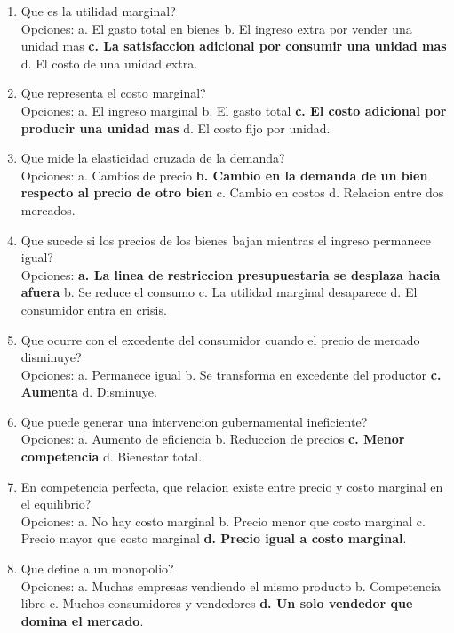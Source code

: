 \documentclass[
	spanish,
	letterpaper, oneside
]{article}
\begin{document}
\begin{enumerate}
	\item Que es la utilidad marginal?\\
	Opciones: a. El gasto total en bienes \quad b. El ingreso extra por vender una unidad mas \quad \textbf{c. La satisfaccion adicional por consumir una unidad mas} \quad d. El costo de una unidad extra.

	\item Que representa el costo marginal?\\
	Opciones: a. El ingreso marginal \quad b. El gasto total \quad \textbf{c. El costo adicional por producir una unidad mas} \quad d. El costo fijo por unidad.

	\item Que mide la elasticidad cruzada de la demanda?\\
	Opciones: a. Cambios de precio \quad \textbf{b. Cambio en la demanda de un bien respecto al precio de otro bien} \quad c. Cambio en costos \quad d. Relacion entre dos mercados.

	\item Que sucede si los precios de los bienes bajan mientras el ingreso permanece igual?\\
	Opciones: \textbf{a. La linea de restriccion presupuestaria se desplaza hacia afuera} \quad b. Se reduce el consumo \quad c. La utilidad marginal desaparece \quad d. El consumidor entra en crisis.

	\item Que ocurre con el excedente del consumidor cuando el precio de mercado disminuye?\\
	Opciones: a. Permanece igual \quad b. Se transforma en excedente del productor \quad \textbf{c. Aumenta} \quad d. Disminuye.

	\item Que puede generar una intervencion gubernamental ineficiente?\\
	Opciones: a. Aumento de eficiencia \quad b. Reduccion de precios \quad \textbf{c. Menor competencia} \quad d. Bienestar total.

	\item En competencia perfecta, que relacion existe entre precio y costo marginal en el equilibrio?\\
	Opciones: a. No hay costo marginal \quad b. Precio menor que costo marginal \quad c. Precio mayor que costo marginal \quad \textbf{d. Precio igual a costo marginal}.

	\item Que define a un monopolio?\\
	Opciones: a. Muchas empresas vendiendo el mismo producto \quad b. Competencia libre \quad c. Muchos consumidores y vendedores \quad \textbf{d. Un solo vendedor que domina el mercado}.


\end{enumerate}
\end{document}
